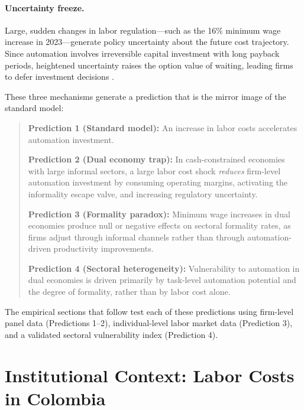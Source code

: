 \documentclass[5p,times,authoryear]{elsarticle}
\begin{document}
\paragraph{Uncertainty freeze.} Large, sudden changes in labor regulation---such as the 16\% minimum wage increase in 2023---generate policy uncertainty about the future cost trajectory. Since automation involves irreversible capital investment with long payback periods, heightened uncertainty raises the option value of waiting, leading firms to defer investment decisions \citep{prettner2020innovation}.

These three mechanisms generate a prediction that is the mirror image of the standard model:

\begin{quote}
\textbf{Prediction 1 (Standard model):} An increase in labor costs accelerates automation investment.

\textbf{Prediction 2 (Dual economy trap):} In cash-constrained economies with large informal sectors, a large labor cost shock \emph{reduces} firm-level automation investment by consuming operating margins, activating the informality escape valve, and increasing regulatory uncertainty.

\textbf{Prediction 3 (Formality paradox):} Minimum wage increases in dual economies produce null or negative effects on sectoral formality rates, as firms adjust through informal channels rather than through automation-driven productivity improvements.

\textbf{Prediction 4 (Sectoral heterogeneity):} Vulnerability to automation in dual economies is driven primarily by task-level automation potential and the degree of formality, rather than by labor cost alone.
\end{quote}

The empirical sections that follow test each of these predictions using firm-level panel data (Predictions 1--2), individual-level labor market data (Prediction 3), and a validated sectoral vulnerability index (Prediction 4).

\FloatBarrier


\section{Institutional Context: Labor Costs in Colombia}
\label{sec:context}
\end{document}
